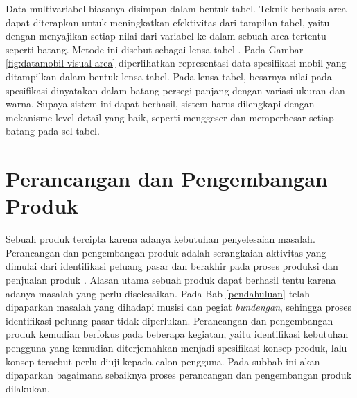 Data multivariabel biasanya disimpan dalam bentuk tabel. Teknik berbasis area dapat diterapkan untuk meningkatkan efektivitas dari tampilan tabel, yaitu dengan menyajikan setiap nilai dari variabel ke dalam sebuah area tertentu seperti batang. Metode ini disebut sebagai lensa tabel \cite{buku_visual}. Pada Gambar \ref{fig:datamobil-visual-area} diperlihatkan representasi data spesifikasi mobil yang ditampilkan dalam bentuk lensa tabel. Pada lensa tabel, besarnya nilai pada spesifikasi dinyatakan dalam batang persegi panjang dengan variasi ukuran dan warna. Supaya sistem ini dapat berhasil, sistem harus dilengkapi dengan mekanisme level-detail yang baik, seperti menggeser dan memperbesar setiap batang pada sel tabel. \par 


\section{Perancangan dan Pengembangan Produk}
Sebuah produk tercipta karena adanya kebutuhan penyelesaian masalah. Perancangan dan pengembangan produk adalah serangkaian aktivitas yang dimulai dari identifikasi peluang pasar dan berakhir pada proses produksi dan penjualan produk \cite{bukuUlrich}. Alasan utama sebuah produk dapat berhasil tentu karena adanya masalah yang perlu diselesaikan. Pada Bab \ref{pendahuluan} telah dipaparkan masalah yang dihadapi musisi dan pegiat \textit{bundengan}, sehingga proses identifikasi peluang pasar tidak diperlukan. Perancangan dan pengembangan produk kemudian berfokus pada beberapa kegiatan, yaitu identifikasi kebutuhan pengguna yang kemudian diterjemahkan menjadi spesifikasi konsep produk, lalu konsep tersebut perlu diuji kepada calon pengguna. Pada subbab ini akan dipaparkan bagaimana sebaiknya proses perancangan dan pengembangan produk dilakukan. \par 
